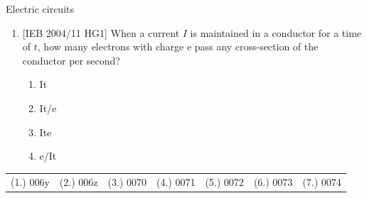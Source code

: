 \begin{eocexercises}{Electric circuits}
\begin{enumerate}[noitemsep, label=\textbf{\arabic*}. ]
{}

\item{[IEB 2004/11 HG1] When a current $I$ is maintained in a conductor for a time of $t$, how many electrons with charge e pass any cross-section of the conductor per second?
\begin{enumerate}[noitemsep, label=\textbf{\arabic*}. ] 
\item{It}
\item{It/e}
\item{Ite}
\item{e/It}
\end{enumerate}}

\end{enumerate}
\par \practiceinfo
 \par \begin{tabular}[h]{cccccc}
 (1.) 006y  &  (2.) 006z  &  (3.) 0070  &  (4.) 0071  &  (5.) 0072  &  (6.) 0073  &  (7.) 0074   \end{tabular}
\end{eocexercises}
